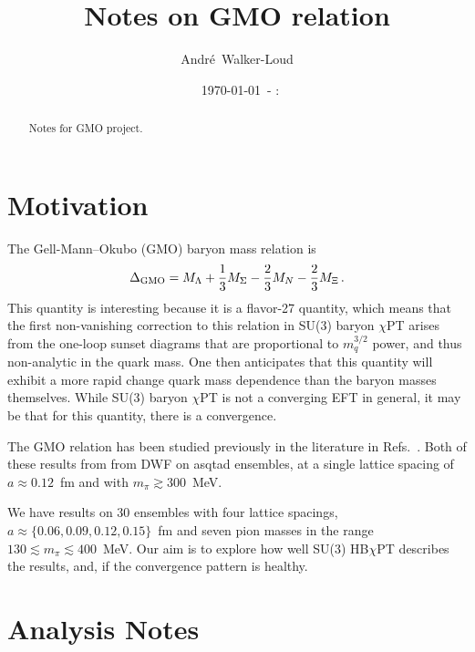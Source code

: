 \documentclass[prd,tightenlines,preprintnumbers,showpacs,superscriptaddress,notitlepage,nofootinbib,eqsecnum,floatfix,notitlepage]{revtex4-1}
\newcommand{\mydate}{\ \today \ - \number\hour :\number\minute}
\begin{document}
\title{Notes on GMO relation}



\author{Andr\'{e}~Walker-Loud}

\date{\mydate}

\begin{abstract}
Notes for GMO project.
\end{abstract}
\maketitle
\tableofcontents

\section{Motivation}
The Gell-Mann--Okubo (GMO) baryon mass relation is
\begin{equation}\label{eq:D_GMO}
{\Delta}_{\rm GMO} = M_{\Lambda} +\frac{1}{3}M_{\Sigma} -\frac{2}{3} M_N -\frac{2}{3} M_\Xi\, .
\end{equation}
This quantity is interesting because it is a flavor-27 quantity, which means that the first non-vanishing correction to this relation in SU(3) baryon $\chi$PT arises from the one-loop sunset diagrams that are proportional to $m_q^{3/2}$ power, and thus non-analytic in the quark mass.
One then anticipates that this quantity will exhibit a more rapid change quark mass dependence than the baryon masses themselves.
While SU(3) baryon $\chi$PT is not a converging EFT in general, it may be that for this quantity, there is a convergence.

The GMO relation has been studied previously in the literature in Refs.~\cite{Beane:2006pt,Walker-Loud:2011yaf}.
Both of these results from from DWF on asqtad ensembles, at a single lattice spacing of $a\approx0.12$~fm and with $m_\pi \gtrsim300$~MeV.

We have results on 30 ensembles with four lattice spacings, $a\approx\{0.06, 0.09, 0.12, 0.15\}$~fm and seven pion masses in the range $130\lesssim m_\pi\lesssim400$~MeV.
Our aim is to explore how well SU(3) HB$\chi$PT describes the results, and, if the convergence pattern is healthy.




\section{Analysis Notes}
\end{document}
